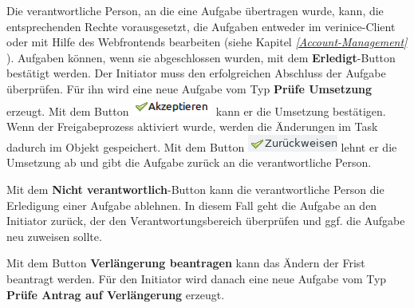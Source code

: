 \documentclass[a4paper,10pt]{book}
\begin{document}
Die verantwortliche Person, an die eine Aufgabe übertragen wurde, kann, die entsprechenden Rechte vorausgesetzt, die Aufgaben entweder im verinice-Client oder mit Hilfe des Webfrontends bearbeiten (siehe Kapitel {\em \ref{Account-Management} }). Aufgaben können, wenn sie abgeschlossen wurden, mit dem \textbf{Erledigt}-Button bestätigt werden. Der Initiator muss den erfolgreichen Abschluss der Aufgabe
überprüfen. Für ihn wird eine neue Aufgabe vom Typ \textbf{Prüfe Umsetzung} erzeugt. Mit dem Button \includegraphics[height=2ex]{Icon/Akzeptieren.png} kann er die Umsetzung bestätigen. Wenn der Freigabeprozess aktiviert wurde, werden die Änderungen im Task dadurch im Objekt gespeichert. Mit dem Button \includegraphics[height=2ex]{Icon/Zurueckweisen.png} lehnt er die Umsetzung ab und gibt die Aufgabe zurück an die verantwortliche Person.

Mit dem \textbf{Nicht verantwortlich}-Button kann die verantwortliche Person die Erledigung einer Aufgabe ablehnen. In diesem Fall geht die Aufgabe an den Initiator zurück, der den Verantwortungsbereich überprüfen und ggf. die Aufgabe neu zuweisen sollte.

Mit dem Button \textbf{Verlängerung beantragen} kann das Ändern der Frist beantragt werden. Für den Initiator wird danach eine neue Aufgabe vom Typ \textbf{Prüfe Antrag auf Verlängerung} erzeugt.
\end{document}
